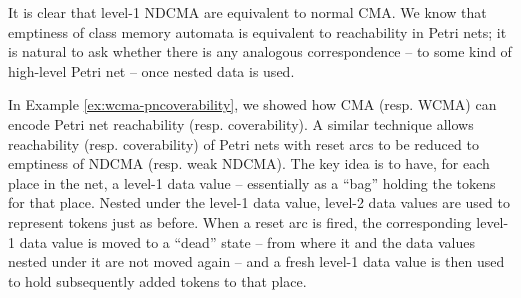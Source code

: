 It is clear that level-1 NDCMA are equivalent to normal CMA.  
We know that emptiness of class memory automata is equivalent to reachability in Petri nets; it is natural to ask whether there is any analogous correspondence -- to some kind of high-level Petri net -- once nested data is used. 

\begin{example}\label{ex:ndcma-pnwr}
In Example \ref{ex:wcma-pncoverability}, we showed how CMA (resp. WCMA) can encode Petri net reachability (resp. coverability).  A similar technique allows reachability (resp. coverability) of Petri nets with reset arcs to be reduced to emptiness of NDCMA (resp. weak NDCMA).  
The key idea is to have, for each place in the net, a level-1 data value -- essentially as a ``bag'' holding the tokens for that place. Nested under the level-1 data value, level-2 data values are used to represent tokens just as before.  
When a reset arc is fired, the corresponding level-1 data value is moved to a ``dead'' state -- from where it and the data values nested under it are not moved again -- and a fresh level-1 data value is then used to hold subsequently added tokens to that place.
\end{example}

